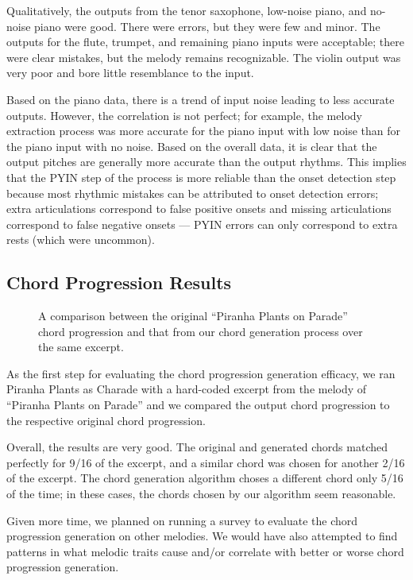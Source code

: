 Qualitatively, the outputs from the tenor saxophone, low-noise piano, and no-noise piano were good. There were errors, but they were few and minor. The outputs for the flute, trumpet, and remaining piano inputs were acceptable; there were clear mistakes, but the melody remains recognizable. The violin output was very poor and bore little resemblance to the input.

Based on the piano data, there is a trend of input noise leading to less accurate outputs. However, the correlation is not perfect; for example, the melody extraction process was more accurate for the piano input with low noise than for the piano input with no noise. Based on the overall data, it is clear that the output pitches are generally more accurate than the output rhythms. This implies that the PYIN step of the process is more reliable than the onset detection step because most rhythmic mistakes can be attributed to onset detection errors; extra articulations correspond to false positive onsets and missing articulations correspond to false negative onsets --- PYIN errors can only correspond to extra rests (which were uncommon).

\subsection{Chord Progression Results}
\label{sec:chord_progression_results}

\begin{figure}
    \resizebox{\linewidth}{!}{}
    \caption{A comparison between the original ``Piranha Plants on Parade'' chord progression and that from our chord generation process over the same excerpt.}
    \label{fig:chord_progression_pie}
\end{figure}
As the first step for evaluating the chord progression generation efficacy, we ran Piranha Plants as Charade with a hard-coded excerpt from the melody of ``Piranha Plants on Parade'' and we compared the output chord progression to the respective original chord progression.

Overall, the results are very good. The original and generated chords matched perfectly for 9/16 of the excerpt, and a similar chord was chosen for another 2/16 of the excerpt. The chord generation algorithm choses a different chord only 5/16 of the time; in these cases, the chords chosen by our algorithm seem reasonable.

Given more time, we planned on running a survey to evaluate the chord progression generation on other melodies. We would have also attempted to find patterns in what melodic traits cause and/or correlate with better or worse chord progression generation.

